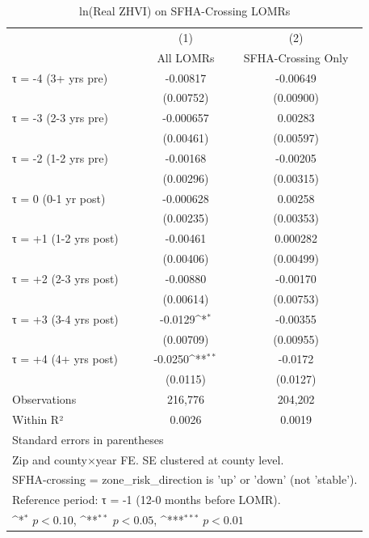 \begin{table}[htbp]\centering
\def\sym#1{\ifmmode^{#1}\else\(^{#1}\)\fi}
\caption{ln(Real ZHVI) on SFHA-Crossing LOMRs}
\begin{tabular}{l*{2}{c}}
\hline\hline
                    &\multicolumn{1}{c}{(1)}&\multicolumn{1}{c}{(2)}\\
                    &\multicolumn{1}{c}{All LOMRs}&\multicolumn{1}{c}{SFHA-Crossing Only}\\
\hline
τ = -4 (3+ yrs pre) &    -0.00817         &    -0.00649         \\
                    &   (0.00752)         &   (0.00900)         \\
[1em]
τ = -3 (2-3 yrs pre)&   -0.000657         &     0.00283         \\
                    &   (0.00461)         &   (0.00597)         \\
[1em]
τ = -2 (1-2 yrs pre)&    -0.00168         &    -0.00205         \\
                    &   (0.00296)         &   (0.00315)         \\
[1em]
τ = 0 (0-1 yr post) &   -0.000628         &     0.00258         \\
                    &   (0.00235)         &   (0.00353)         \\
[1em]
τ = +1 (1-2 yrs post)&    -0.00461         &    0.000282         \\
                    &   (0.00406)         &   (0.00499)         \\
[1em]
τ = +2 (2-3 yrs post)&    -0.00880         &    -0.00170         \\
                    &   (0.00614)         &   (0.00753)         \\
[1em]
τ = +3 (3-4 yrs post)&     -0.0129\sym{*}  &    -0.00355         \\
                    &   (0.00709)         &   (0.00955)         \\
[1em]
τ = +4 (4+ yrs post)&     -0.0250\sym{**} &     -0.0172         \\
                    &    (0.0115)         &    (0.0127)         \\
\hline
Observations        &     216,776         &     204,202         \\
Within R²           &      0.0026         &      0.0019         \\
\hline\hline
\multicolumn{3}{l}{\footnotesize Standard errors in parentheses}\\
\multicolumn{3}{l}{\footnotesize Zip and county×year FE. SE clustered at county level.}\\
\multicolumn{3}{l}{\footnotesize SFHA-crossing = zone\_risk\_direction is 'up' or 'down' (not 'stable').}\\
\multicolumn{3}{l}{\footnotesize Reference period: τ = -1 (12-0 months before LOMR).}\\
\multicolumn{3}{l}{\footnotesize \sym{*} \(p<0.10\), \sym{**} \(p<0.05\), \sym{***} \(p<0.01\)}\\
\end{tabular}
\end{table}
